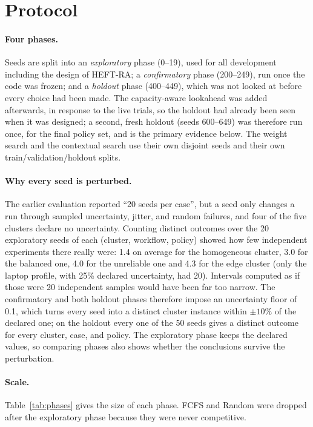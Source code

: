\documentclass[12pt,a4paper]{report}
\begin{document}
\section{Protocol}
\label{sec:protocol}

\paragraph{Four phases.} Seeds are split into an \emph{exploratory} phase
(0--19), used for all development including the design of HEFT-RA; a
\emph{confirmatory} phase (200--249), run once the code was frozen; and a
\emph{holdout} phase (400--449), which was not looked at before every
choice had been made. The capacity-aware lookahead was added afterwards,
in response to the live trials, so the holdout had already been seen when
it was designed; a second, fresh holdout (seeds 600--649) was therefore
run once, for the final policy set, and is the primary evidence below. The
weight search and the contextual search use their own disjoint seeds and
their own train/validation/holdout splits.

\paragraph{Why every seed is perturbed.} The earlier evaluation reported
``20 seeds per case'', but a seed only changes a run through sampled
uncertainty, jitter, and random failures, and four of the five clusters
declare no uncertainty. Counting distinct outcomes over the 20 exploratory
seeds of each (cluster, workflow, policy) showed how few independent
experiments there really were: 1.4 on average for the homogeneous
cluster, 3.0 for the balanced one, 4.0 for the unreliable one and 4.3 for
the edge cluster (only the laptop profile, with 25\% declared uncertainty,
had 20). Intervals computed as if those were 20 independent samples would
have been far too narrow. The confirmatory and both holdout phases
therefore impose an uncertainty floor of 0.1, which turns every seed into a
distinct cluster instance within $\pm10\%$ of the declared one; on the
holdout every one of the 50 seeds gives a distinct outcome for every
cluster, case, and policy. The exploratory phase keeps the declared
values, so comparing phases also shows whether the conclusions survive the
perturbation.

\paragraph{Scale.} Table~\ref{tab:phases} gives the size of each phase.
FCFS and Random were dropped after the exploratory phase because they
were never competitive.
\end{document}
